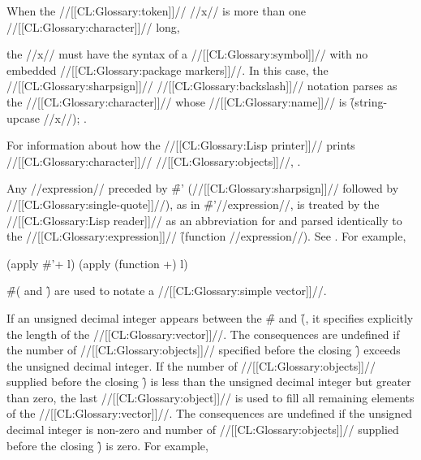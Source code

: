 When the //[[CL:Glossary:token]]// //x// is more than one //[[CL:Glossary:character]]// long,

the //x// must have the syntax of a //[[CL:Glossary:symbol]]// 
with no embedded //[[CL:Glossary:package markers]]//.
In this case, the //[[CL:Glossary:sharpsign]]// //[[CL:Glossary:backslash]]// notation
parses as the //[[CL:Glossary:character]]// whose //[[CL:Glossary:name]]// is \f{(string-upcase //x//)};
\seesection\CharacterNames.










For information about how the //[[CL:Glossary:Lisp printer]]// prints //[[CL:Glossary:character]]// //[[CL:Glossary:objects]]//,
\seesection\PrintingCharacters.

\endsubsubsection%










Any //expression// preceded by \f{\#'} 
(//[[CL:Glossary:sharpsign]]// followed by //[[CL:Glossary:single-quote]]//),
as in \f{\#'//expression//},
is treated by the //[[CL:Glossary:Lisp reader]]// as an abbreviation for and parsed identically 
to the //[[CL:Glossary:expression]]// \f{(function //expression//)}.
See .  For example,

\code
(apply #'+ l) \EQ (apply (function +) l)
\endcode

\endsubsubsection%
                   




\f{\#(} and \f{)} are used to notate a //[[CL:Glossary:simple vector]]//. 


If an unsigned decimal integer
appears between the \f{\#} and \f{(},
it specifies explicitly the length of the //[[CL:Glossary:vector]]//.  
The consequences are undefined if the number of //[[CL:Glossary:objects]]// 
specified before the closing \f{)}
exceeds the unsigned decimal integer.
If the number of //[[CL:Glossary:objects]]// supplied before the closing \f{)}
is less than the unsigned decimal integer but greater than zero,
the last //[[CL:Glossary:object]]//
is used to fill all
remaining elements of the //[[CL:Glossary:vector]]//.
The consequences are undefined if the unsigned decimal integer is non-zero and
number of //[[CL:Glossary:objects]]// supplied before the closing \f{)}
is zero.
For example,

